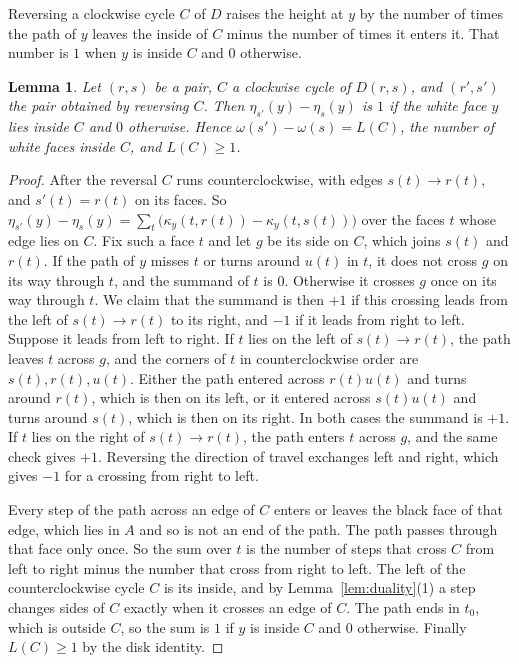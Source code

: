\documentclass[10pt]{amsart}
\numberwithin{equation}{section}
\newtheorem{lemma}[equation]{Lemma}
\theoremstyle{definition}
\theoremstyle{remark}
\begin{document}
Reversing a clockwise cycle $C$ of $D$ raises the height at $y$ by the number of times the path of $y$ leaves the inside of $C$ minus the number of times it enters it.
That number is $1$ when $y$ is inside $C$ and $0$ otherwise.

\begin{lemma}\label{lem:height}
Let $(r,s)$ be a pair, $C$ a clockwise cycle of $D(r,s)$, and $(r',s')$ the pair obtained by reversing $C$.
Then $\eta_{s'}(y)-\eta_s(y)$ is $1$ if the white face $y$ lies inside $C$ and $0$ otherwise.
Hence $\omega(s')-\omega(s)=L(C)$, the number of white faces inside $C$, and $L(C)\ge1$.
\end{lemma}

\begin{proof}
After the reversal $C$ runs counterclockwise, with edges $s(t)\to r(t)$, and $s'(t)=r(t)$ on its faces.
So $\eta_{s'}(y)-\eta_s(y)=\sum_t\bigl(\kappa_y(t,r(t))-\kappa_y(t,s(t))\bigr)$ over the faces $t$ whose edge lies on $C$.
Fix such a face $t$ and let $g$ be its side on $C$, which joins $s(t)$ and $r(t)$.
If the path of $y$ misses $t$ or turns around $u(t)$ in $t$, it does not cross $g$ on its way through $t$, and the summand of $t$ is $0$.
Otherwise it crosses $g$ once on its way through $t$.
We claim that the summand is then $+1$ if this crossing leads from the left of $s(t)\to r(t)$ to its right, and $-1$ if it leads from right to left.
Suppose it leads from left to right.
If $t$ lies on the left of $s(t)\to r(t)$, the path leaves $t$ across $g$, and the corners of $t$ in counterclockwise order are $s(t),r(t),u(t)$.
Either the path entered across $r(t)u(t)$ and turns around $r(t)$, which is then on its left, or it entered across $s(t)u(t)$ and turns around $s(t)$, which is then on its right.
In both cases the summand is $+1$.
If $t$ lies on the right of $s(t)\to r(t)$, the path enters $t$ across $g$, and the same check gives $+1$.
Reversing the direction of travel exchanges left and right, which gives $-1$ for a crossing from right to left.

Every step of the path across an edge of $C$ enters or leaves the black face of that edge, which lies in $A$ and so is not an end of the path. The path passes through that face only once.
So the sum over $t$ is the number of steps that cross $C$ from left to right minus the number that cross from right to left.
The left of the counterclockwise cycle $C$ is its inside, and by Lemma~\ref{lem:duality}(1) a step changes sides of $C$ exactly when it crosses an edge of $C$.
The path ends in $t_0$, which is outside $C$, so the sum is $1$ if $y$ is inside $C$ and $0$ otherwise.
Finally $L(C)\ge1$ by the disk identity.
\end{proof}
\end{document}
